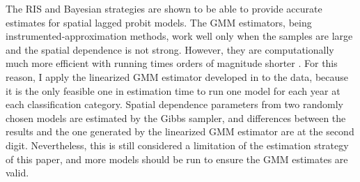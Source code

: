 The RIS and Bayesian strategies are shown to be able to provide accurate estimates for spatial lagged probit models. The GMM estimators, being instrumented-approximation methods, work well only when the samples are large and the spatial dependence is not strong. However, they are computationally much more efficient with running times orders of magnitude shorter \cite{calabrese2014estimators}. For this reason, I apply the linearized GMM estimator developed in \cite{klier2008clustering} to the data, because it is the only feasible one in estimation time to run one model for each year at each classification category. Spatial dependence parameters from two randomly chosen models are estimated by the Gibbs sampler, and differences between the results and the one generated by the linearized GMM estimator are at the second digit. Nevertheless, this is still considered a limitation of the estimation strategy of this paper, and more models should be run to ensure the GMM estimates are valid.

